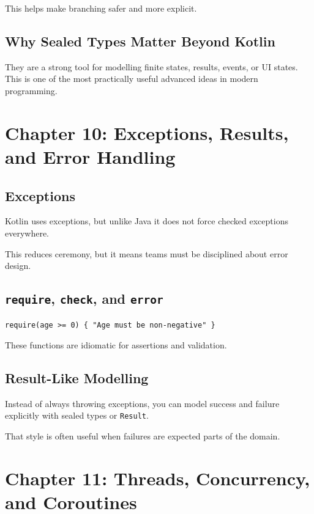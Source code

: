 \documentclass[11pt,a4paper]{article}
\begin{document}
This helps make branching safer and more explicit.

\subsection{Why Sealed Types Matter Beyond Kotlin}

They are a strong tool for modelling finite states, results, events, or UI states. This is one of the most practically useful advanced ideas in modern programming.

\section{Chapter 10: Exceptions, Results, and Error Handling}

\subsection{Exceptions}

Kotlin uses exceptions, but unlike Java it does not force checked exceptions everywhere.

This reduces ceremony, but it means teams must be disciplined about error design.

\subsection{\texttt{require}, \texttt{check}, and \texttt{error}}

\begin{lstlisting}[style=kazekotlin]
require(age >= 0) { "Age must be non-negative" }
\end{lstlisting}

These functions are idiomatic for assertions and validation.

\subsection{Result-Like Modelling}

Instead of always throwing exceptions, you can model success and failure explicitly with sealed types or \texttt{Result}.

That style is often useful when failures are expected parts of the domain.

\section{Chapter 11: Threads, Concurrency, and Coroutines}
\end{document}
